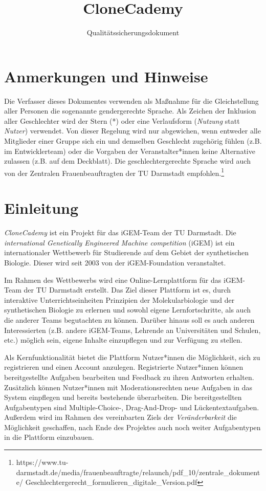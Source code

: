 \documentclass[accentcolor=tud0b,12pt,paper=a4]{tudreport}
\title{CloneCademy}
\subtitle{Qualitätssicherungsdokument}
\begin{document}
\maketitle
\tableofcontents

\chapter*{Anmerkungen und Hinweise}
Die Verfasser dieses Dokumentes verwenden als Maßnahme für die Gleichstellung aller Personen die sogenannte gendergerechte Sprache. Als Zeichen der Inklusion aller Geschlechter wird der Stern (*) oder eine Verlaufsform (\emph{Nutzung} statt \emph{Nutzer}) verwendet. Von dieser Regelung wird nur abgewichen, wenn entweder alle Mitglieder einer Gruppe sich ein und demselben Geschlecht zugehörig fühlen (z.B. im Entwicklerteam) oder die Vorgaben der Veranstalter*innen keine Alternative zulassen (z.B. auf dem Deckblatt). Die geschlechtergerechte Sprache wird auch von der Zentralen Frauenbeauftragten der TU Darmstadt empfohlen.\footnote{https://www.tu-darmstadt.de/media/frauenbeauftragte/relaunch/pdf\_10/zentrale\_dokumente/ Geschlechtergerecht\_formulieren\_digitale\_Version.pdf}

\chapter{Einleitung}

\emph{CloneCademy} ist ein Projekt für das iGEM-Team der TU Darmstadt. Die \emph{international Genetically Engineered Machine competition} (iGEM) ist ein internationaler Wettbewerb für Studierende auf dem Gebiet der synthetischen Biologie.
Dieser wird seit 2003 von der iGEM-Foundation veranstaltet.

Im Rahmen des Wettbewerbs wird eine Online-Lernplattform für das iGEM-Team der TU Darmstadt erstellt. Das Ziel dieser Plattform ist es, durch interaktive Unterrichtseinheiten Prinzipien der Molekularbiologie und der synthetischen Biologie zu erlernen und sowohl eigene Lernfortschritte, als auch die anderer Teams begutachten zu können. Darüber hinaus soll es auch anderen Interessierten (z.B. andere iGEM-Teams, Lehrende an Universitäten und Schulen, etc.) möglich sein, eigene Inhalte einzupflegen und zur Verfügung zu stellen.

Als Kernfunktionalität bietet die Plattform Nutzer*innen die Möglichkeit, sich zu registrieren und einen Account anzulegen. Registrierte Nutzer*innen können bereitgestellte Aufgaben bearbeiten und Feedback zu ihren Antworten erhalten. Zusätzlich können Nutzer*innen mit Moderationsrechten neue Aufgaben in das System einpflegen und bereits bestehende überarbeiten. Die bereitgestellten Aufgabentypen sind Multiple-Choice-, Drag-And-Drop- und Lückentextaufgaben. Außerdem wird im Rahmen des vereinbarten Ziels der \emph{Veränderbarkeit} die Möglichkeit geschaffen, nach Ende des Projektes auch noch weiter Aufgabentypen in die Plattform einzubauen.
\end{document}
